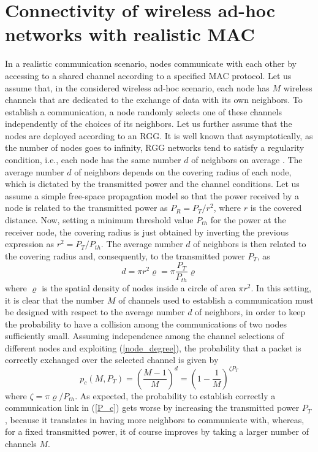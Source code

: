 \documentclass[10pt,twocolumn]{IEEEtran}
\begin{document}
\section{Connectivity of wireless ad-hoc networks with realistic MAC}

In a realistic communication scenario, nodes communicate with each other by accessing to a shared channel according to a specified MAC protocol. Let us assume that, in the considered wireless ad-hoc scenario, each node has $M$ wireless channels that are dedicated to the exchange of data with its own neighbors. To establish a communication, a node randomly selects one of these channels independently of the choices of its neighbors. Let us further assume that the nodes are deployed according to an RGG. It is well known that asymptotically, as the number of nodes goes to infinity, RGG networks tend to satisfy a regularity condition, i.e., each node has the same number $d$ of neighbors on average \cite{Penrose}. The average number $d$ of neighbors depends on the covering radius of each node, which is dictated by the transmitted power and the channel conditions. Let us assume a simple free-space propagation model so that the power received by a node is related to the transmitted power as $P_R=P_{T}/r^2$, where $r$ is the covered distance. Now, setting a minimum threshold value $P_{th}$ for the power at the receiver node, the covering radius is just obtained by inverting the previous expression as $r^2=P_{T}/P_{th}$. The average number $d$ of neighbors is then related to the covering radius and, consequently, to the transmitted power $P_{T}$, as
\begin{equation}\label{node_degree}
d=\pi r^2\varrho=\pi \frac{P_{T}}{P_{th}}\varrho
\end{equation}
where $\varrho$ is the spatial density of nodes inside a circle of area $\pi r^2$. In this setting, it is clear that the number $M$ of channels used to establish a communication must be designed with respect to the average number $d$ of neighbors, in order to keep the probability to have a collision among the communications of two nodes sufficiently small. Assuming independence among the channel selections of different nodes and exploiting (\ref{node_degree}), the probability that a packet is correctly exchanged over the selected channel is given by
\begin{equation}\label{P_c}
  p_c(M,P_T)=\left(\frac{M-1}{M}\right)^d=\left(1-\frac{1}{M}\right)^{\zeta P_T}
\end{equation}
where $\zeta=\pi\varrho/P_{th}$.  As expected, the probability to establish correctly a communication link in (\ref{P_c}) gets worse by increasing the transmitted power $P_T$, because it translates in having more neighbors to communicate with, whereas, for a fixed transmitted power, it of course improves by taking a larger number of channels $M$.
\end{document}
